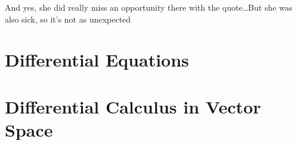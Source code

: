 \documentclass{article}
\begin{document}
And yes, she did really miss an opportunity there with the quote\dots But she was also sick, so it's not as unexpected



\newsection
\section{Differential Equations}





\section{Differential Calculus in Vector Space}

\end{document}
